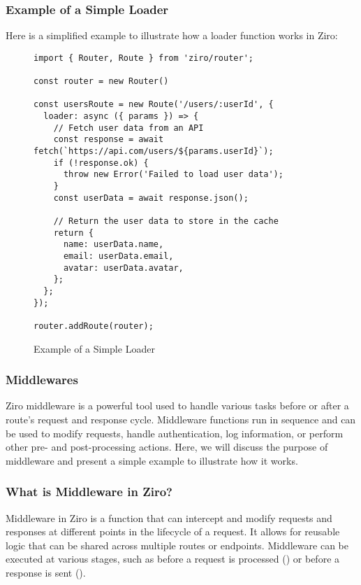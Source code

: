 \pagebreak
\subsubsection*{Example of a Simple Loader}
Here is a simplified example to illustrate how a loader function works in Ziro:
\begin{figure}[h!]
\begin{verbatim}
import { Router, Route } from 'ziro/router';

const router = new Router()

const usersRoute = new Route('/users/:userId', {
  loader: async ({ params }) => {
    // Fetch user data from an API
    const response = await fetch(`https://api.com/users/${params.userId}`);
    if (!response.ok) {
      throw new Error('Failed to load user data');
    }
    const userData = await response.json();

    // Return the user data to store in the cache
    return {
      name: userData.name,
      email: userData.email,
      avatar: userData.avatar,
    };
  };
});

router.addRoute(router);
\end{verbatim}
\caption{Example of a Simple Loader}
\end{figure}


\subsubsection{Middlewares}
Ziro middleware is a powerful tool used to handle various tasks before or after a route's request and response cycle. Middleware functions run in sequence and can be used to modify requests, handle authentication, log information, or perform other pre- and post-processing actions. Here, we will discuss the purpose of middleware and present a simple example to illustrate how it works.

\subsubsection*{What is Middleware in Ziro?}
Middleware in Ziro is a function that can intercept and modify requests and responses at different points in the lifecycle of a request. It allows for reusable logic that can be shared across multiple routes or endpoints. Middleware can be executed at various stages, such as before a request is processed () or before a response is sent ().

